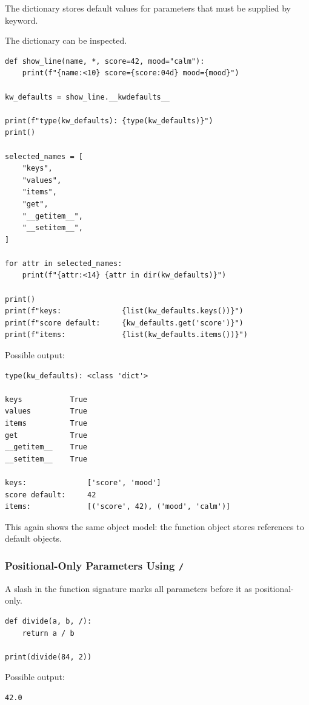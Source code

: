 The dictionary stores default values for parameters that must be supplied by keyword.

The dictionary can be inspected.

\begin{verbatim}
def show_line(name, *, score=42, mood="calm"):
    print(f"{name:<10} score={score:04d} mood={mood}")

kw_defaults = show_line.__kwdefaults__

print(f"type(kw_defaults): {type(kw_defaults)}")
print()

selected_names = [
    "keys",
    "values",
    "items",
    "get",
    "__getitem__",
    "__setitem__",
]

for attr in selected_names:
    print(f"{attr:<14} {attr in dir(kw_defaults)}")

print()
print(f"keys:              {list(kw_defaults.keys())}")
print(f"score default:     {kw_defaults.get('score')}")
print(f"items:             {list(kw_defaults.items())}")
\end{verbatim}

Possible output:

\begin{verbatim}
type(kw_defaults): <class 'dict'>

keys           True
values         True
items          True
get            True
__getitem__    True
__setitem__    True

keys:              ['score', 'mood']
score default:     42
items:             [('score', 42), ('mood', 'calm')]
\end{verbatim}

This again shows the same object model: the function object stores references to default objects.

\subsubsection{Positional-Only Parameters Using \texttt{/}}

A slash in the function signature marks all parameters before it as positional-only.

\begin{verbatim}
def divide(a, b, /):
    return a / b

print(divide(84, 2))
\end{verbatim}

Possible output:

\begin{verbatim}
42.0
\end{verbatim}

